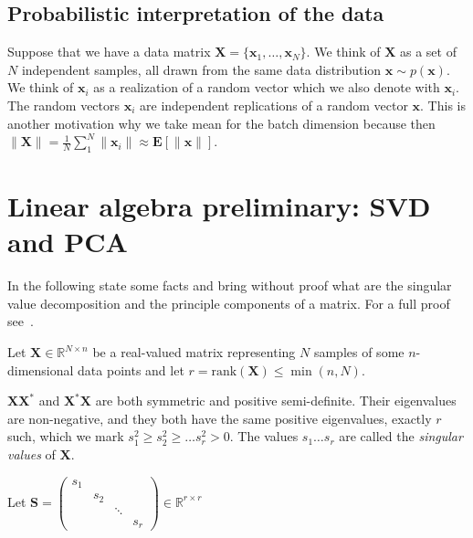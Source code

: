 \documentclass[11pt, a4paper]{report}
\theoremstyle{plain}
\theoremstyle{definition}
\theoremstyle{remark}
\newcommand{\R}{\mathbb{R}}
\newcommand{\E}{\mathbf{E}}
\newcommand{\X}{\mathbf{X}}
\newcommand{\x}{\mathbf{x}}
\newcommand{\Y}{\mathbf{Y}}
\newcommand{\bv}[1]{\boldsymbol{#1}}
\newcommand{\gt}{>}
\begin{document}


\subsection{Probabilistic interpretation of the data}
Suppose that we have a data matrix $\X = \{\x_1, \dots , \x_N\}$.
We think of $\X$ as a set of $N$ independent samples, all drawn from the same
data distribution $\x \sim p(\x)$. We think of $\x_i$ as a realization of a
random vector which we also denote with $\x_i$. 
The random vectors $\x_i$ are independent replications of a random vector $\x$.
This is another motivation why we take mean for the batch dimension because
then $\|\X\| = \frac{1}{N} \sum_1^N \|\x_i\| \approx \E [\|\x\|]$.


\section{Linear algebra preliminary: SVD and PCA}
In the following state some facts and bring without proof what are the singular
value decomposition and the principle components of a matrix. For a full proof
see~\cite{serre2001matrices}.

Let $\bv{X} \in \R^{N \times n}$ be a real-valued matrix representing $N$
samples of some $n$-dimensional data points and let $r= \text{rank}(\bv{X}) \leq
\min(n,N)$. 

$\X \X^*$ and $\X^* \X$ are both symmetric and positive semi-definite. Their
eigenvalues are non-negative, and they both have the same positive eigenvalues,
exactly $r$ such, which we mark $s_1^2 \geq s_2^2 \geq \dots s_r^2 \gt 0$. The
values $s_1 \dots s_r$ are called the \emph{singular values} of $\bv{X}$.

Let $\bv{S} = 
\begin{pmatrix}
s_1 & & &\\
& s_2 & &\\
& & \ddots &\\
& & & s_r
\end{pmatrix} \in \R^{r \times r}
$
\end{document}
